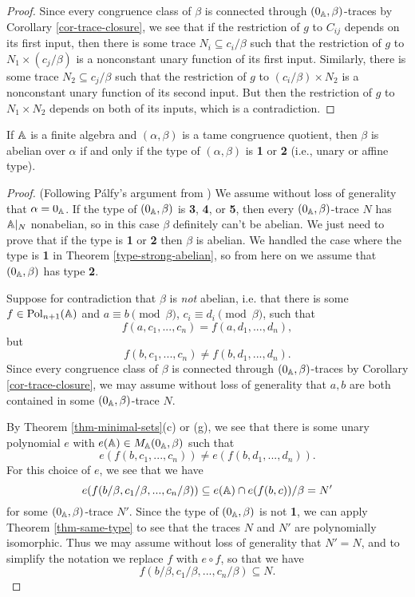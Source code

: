 \begin{appendices}
\begin{proof}
Since every congruence class of $\beta$ is connected through $(0_{\mathbb{A}},\beta)$-traces by Corollary \ref{cor-trace-closure}, we see that if the restriction of $g$ to $C_{ij}$ depends on its first input, then there is some trace $N_i \subseteq c_i/\beta$ such that the restriction of $g$ to $N_1 \times (c_j/\beta)$ is a nonconstant unary function of its first input. Similarly, there is some trace $N_2 \subseteq c_j/\beta$ such that the restriction of $g$ to $(c_i/\beta) \times N_2$ is a nonconstant unary function of its second input. But then the restriction of $g$ to $N_1 \times N_2$ depends on both of its inputs, which is a contradiction.
\end{proof}

\begin{thm}\label{type-abelian} If $\mathbb{A}$ is a finite algebra and $(\alpha, \beta)$ is a tame congruence quotient, then $\beta$ is abelian over $\alpha$ if and only if the type of $(\alpha, \beta)$ is \textbf{1} or \textbf{2} (i.e., unary or affine type).
\end{thm}
\begin{proof} (Following P\'alfy's argument from \cite{hobby-mckenzie}) We assume without loss of generality that $\alpha = 0_{\mathbb{A}}$. If the type of $(0_{\mathbb{A}}, \beta)$ is \textbf{3}, \textbf{4}, or \textbf{5}, then every $(0_{\mathbb{A}},\beta)$-trace $N$ has $\mathbb{A}|_N$ nonabelian, so in this case $\beta$ definitely can't be abelian. We just need to prove that if the type is \textbf{1} or \textbf{2} then $\beta$ is abelian. We handled the case where the type is \textbf{1} in Theorem \ref{type-strong-abelian}, so from here on we assume that $(0_{\mathbb{A}}, \beta)$ has type \textbf{2}.

Suppose for contradiction that $\beta$ is \emph{not} abelian, i.e. that there is some $f \in \operatorname{Pol}_{n+1}(\mathbb{A})$ and $a \equiv b \pmod{\beta}$, $c_i \equiv d_i \pmod{\beta}$, such that
\[
f(a, c_1, ..., c_n) = f(a, d_1, ..., d_n),
\]
but
\[
f(b, c_1, ..., c_n) \ne f(b, d_1, ..., d_n).
\]
Since every congruence class of $\beta$ is connected through $(0_{\mathbb{A}},\beta)$-traces by Corollary \ref{cor-trace-closure}, we may assume without loss of generality that $a,b$ are both contained in some $(0_{\mathbb{A}},\beta)$-trace $N$.

By Theorem \ref{thm-minimal-sets}(c) or (g), we see that there is some unary polynomial $e$ with $e(\mathbb{A}) \in M_{\mathbb{A}}(0_{\mathbb{A}},\beta)$ such that
\[
e(f(b, c_1, ..., c_n)) \ne e(f(b, d_1, ..., d_n)).
\]
For this choice of $e$, we see that we have
\[
e(f(b/\beta, c_1/\beta, ..., c_n/\beta)) \subseteq e(\mathbb{A}) \cap e(f(b,c))/\beta = N'
\]
for some $(0_{\mathbb{A}},\beta)$-trace $N'$. Since the type of $(0_{\mathbb{A}},\beta)$ is not \textbf{1}, we can apply Theorem \ref{thm-same-type} to see that the traces $N$ and $N'$ are polynomially isomorphic. Thus we may assume without loss of generality that $N' = N$, and to simplify the notation we replace $f$ with $e \circ f$, so that we have
\[
f(b/\beta, c_1/\beta, ..., c_n/\beta) \subseteq N.
\]


\end{proof}
\end{appendices}
